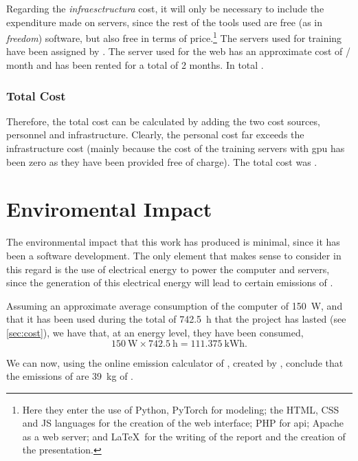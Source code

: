 Regarding the \emph{infraesctructura} cost, it will only be necessary to
include the expenditure made on servers, since the rest of the tools used are
free (as in \emph{freedom}) software, but also free in terms of
price.\footnote{Here they enter the use of Python, PyTorch for modeling; the
  HTML, CSS and JS languages for the creation of the web interface; PHP for
  \gls{api}; Apache as a web server; and \LaTeX \ for the writing of the report
  and the creation of the presentation.} The servers used for training have
been assigned by . The
server used for the web has an approximate cost of  / month and has
been rented for a total of 2 months. In total .

\subsubsection{Total Cost}

Therefore, the total cost can be calculated by adding the two cost sources,
personnel and infrastructure. Clearly, the personal cost far exceeds the
infrastructure cost (mainly because the cost of the training servers with
\gls{gpu} has been zero as they have been provided free of charge). The total
cost was .



\section{Enviromental Impact} \label{sec:enviromental}

The environmental impact that this work has produced is minimal, since it has
been a software development. The only element that makes sense to consider in
this regard is the use of electrical energy to power the computer and servers,
since the generation of this electrical energy will lead to certain emissions
of .

Assuming an approximate average consumption of the computer of \SI{150}{\watt},
and that it has been used during the total of \SI{742.5}{\hour} that the
project has lasted (see \vref{sec:cost}), we have that, at an energy level,
they have been consumed,
\begin{equation}
  \SI{150}{\watt} \times \SI{742.5}{\hour} = \SI{111.375}{\kWh}.
\end{equation}

We can now, using the online emission calculator of , created by
, conclude that the emissions of  are
\SI{39}{\kg} of .

